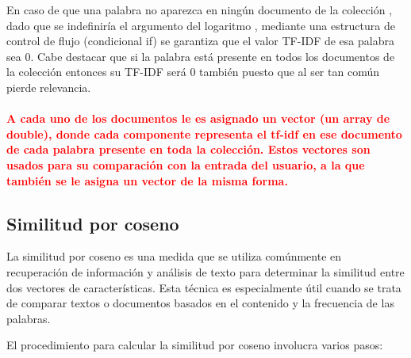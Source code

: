 \documentclass[a4paper, 12pt]{article}
\begin{document}
En caso de que una palabra no aparezca en ningún documento de la colección , dado que se indefiniría el argumento del logaritmo , mediante una estructura de control de flujo (condicional if) se garantiza que el valor TF-IDF de esa palabra sea 0. Cabe destacar que si la palabra está presente en todos los documentos de la colección entonces su TF-IDF será 0 también puesto que al ser tan común pierde relevancia.

\paragraph{\textcolor{red}{
A cada uno de los documentos le es asignado un vector (un array de double), donde cada componente representa el tf-idf en ese documento de cada palabra presente en toda la colección. Estos vectores son usados para su comparación con la entrada del usuario, a la que también se le asigna un vector de la misma forma.}}


\subsection{Similitud por coseno}
 La similitud por coseno es una medida que se utiliza comúnmente en recuperación de información y análisis de texto para determinar la similitud entre dos vectores de características. Esta técnica es especialmente útil cuando se trata de comparar textos o documentos basados en el contenido y la frecuencia de las palabras.

El procedimiento para calcular la similitud por coseno involucra varios pasos:
\end{document}
